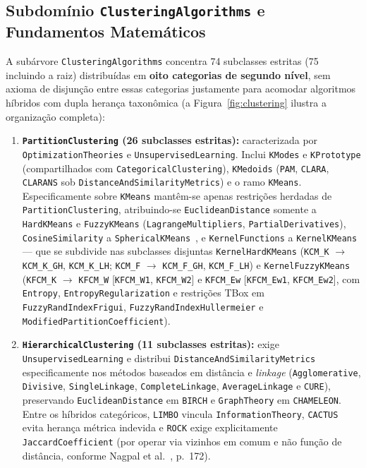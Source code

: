\documentclass[11pt,a4paper]{article}
\newcommand{\onto}[1]{\texttt{#1}}
\begin{document}
\subsection{Subdomínio \onto{ClusteringAlgorithms} e Fundamentos Matemáticos}

A subárvore \onto{ClusteringAlgorithms} concentra 74 subclasses estritas (75 incluindo a raiz) distribuídas em \textbf{oito categorias de segundo nível}, sem axioma de disjunção entre essas categorias justamente para acomodar algoritmos híbridos com dupla herança taxonômica (a Figura~\ref{fig:clustering} ilustra a organização completa):
\begin{enumerate}[leftmargin=*,nosep]
  \item \textbf{\onto{PartitionClustering} (26 subclasses estritas):} caracterizada por \onto{OptimizationTheories} e \onto{UnsupervisedLearning}. Inclui \onto{KModes} e \onto{KPrototype} (compartilhados com \onto{CategoricalClustering}), \onto{KMedoids} (\onto{PAM}, \onto{CLARA}, \onto{CLARANS} sob \onto{DistanceAndSimilarityMetrics}) e o ramo \onto{KMeans}. Especificamente sobre \onto{KMeans} mantêm-se apenas restrições herdadas de \onto{PartitionClustering}, atribuindo-se \onto{EuclideanDistance} somente a \onto{HardKMeans} e \onto{FuzzyKMeans} (\onto{LagrangeMultipliers}, \onto{PartialDerivatives}), \onto{CosineSimilarity} a \onto{SphericalKMeans}~\cite{dhillon2001concept,yin2026rapid}, e \onto{KernelFunctions} a \onto{KernelKMeans} --- que se subdivide nas subclasses disjuntas \onto{KernelHardKMeans} (\onto{KCM\_K} $\rightarrow$ \onto{KCM\_K\_GH}, \onto{KCM\_K\_LH}; \onto{KCM\_F} $\rightarrow$ \onto{KCM\_F\_GH}, \onto{KCM\_F\_LH}) e \onto{KernelFuzzyKMeans} (\onto{KFCM\_K} $\rightarrow$ \onto{KFCM\_W} [\onto{KFCM\_W1}, \onto{KFCM\_W2}] e \onto{KFCM\_Ew} [\onto{KFCM\_Ew1}, \onto{KFCM\_Ew2}], com \onto{Entropy}, \onto{EntropyRegularization} e restrições TBox em \onto{FuzzyRandIndexFrigui}, \onto{FuzzyRandIndexHullermeier} e \onto{ModifiedPartitionCoefficient}).
  \item \textbf{\onto{HierarchicalClustering} (11 subclasses estritas):} exige \onto{UnsupervisedLearning} e distribui \onto{DistanceAndSimilarityMetrics} especificamente nos métodos baseados em distância e \emph{linkage} (\onto{Agglomerative}, \onto{Divisive}, \onto{SingleLinkage}, \onto{CompleteLinkage}, \onto{AverageLinkage} e \onto{CURE}), preservando \onto{EuclideanDistance} em \onto{BIRCH} e \onto{GraphTheory} em \onto{CHAMELEON}. Entre os híbridos categóricos, \onto{LIMBO} vincula \onto{InformationTheory}, \onto{CACTUS} evita herança métrica indevida e \onto{ROCK} exige explicitamente \onto{JaccardCoefficient} (por operar via vizinhos em comum e não função de distância, conforme Nagpal et al.~\cite{nagpal2013review}, p.~172).

\end{enumerate}
\end{document}

